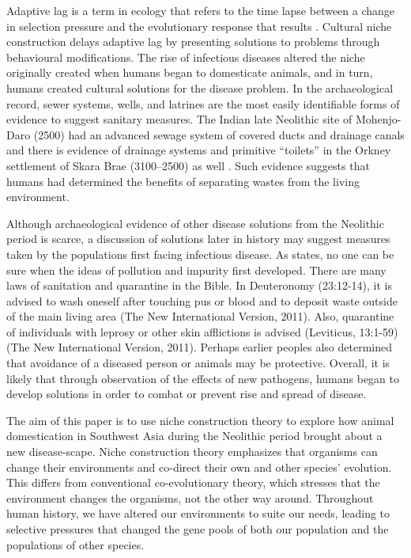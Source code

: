 Adaptive lag is a term in ecology that refers to the time lapse between a change in selection pressure and the evolutionary response that results \parencite[98]{Laland_2006}. 
Cultural niche construction delays adaptive lag by presenting solutions to problems through behavioural modifications. 
The rise of infectious diseases altered the niche originally created when humans began to domesticate animals, and in turn, humans created cultural solutions for the disease problem. 
In the archaeological record, sewer systems, wells, and latrines are the most easily identifiable forms of evidence to suggest sanitary measures.
The Indian late Neolithic site of Mohenjo-Daro (2500\BC) had an advanced sewage system of covered ducts and drainage canals \parencite[121]{Mughal_2011} 
and there is evidence of drainage systems and primitive “toilets” 
in the Orkney settlement of Skara Brae (3100--2500\BC) as well \parencite{Gordon-Childe_1983}. 
Such evidence suggests that humans had determined the benefits of separating wastes from the living environment.

Although archaeological evidence of other disease solutions from the Neolithic period is scarce, 
a discussion of solutions later in history may suggest measures taken by the populations 
first facing infectious disease. As \textcite[3]{Douglas_1966} states, 
no one can be sure when the ideas of pollution and impurity first developed. 
There are many laws of sanitation and quarantine in the Bible. In Deuteronomy (23:12-14), 
it is advised to wash oneself after touching pus or blood and to deposit waste outside of the main living area (The New International Version, 2011). 
Also, quarantine of individuals with leprosy or other skin afflictions is advised (Leviticus, 13:1-59) (The New International Version, 2011). 
Perhaps earlier peoples also determined that avoidance of a diseased person or animals may be protective. Overall, it is likely that through observation of the effects of new pathogens, humans began to develop solutions in order to combat or prevent rise and spread of disease.

The aim of this paper is to use niche construction theory to explore how animal domestication in Southwest Asia during the Neolithic period brought about a new disease-scape. Niche construction theory emphasizes that organisms can change their environments and co-direct their own and other species’ evolution. This differs from conventional co-evolutionary theory, which stresses that the environment changes the organisms, not the other way around. Throughout human history, we have altered our environments to suite our needs, leading to selective pressures that changed the gene pools of both our population and the populations of other species.

